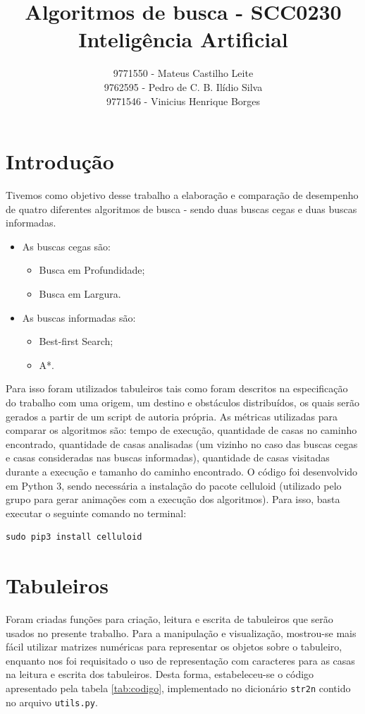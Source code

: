 \documentclass[12pt]{article}
\title{Algoritmos de busca - SCC0230 Inteligência Artificial}
\author{9771550 - Mateus Castilho Leite\\
9762595 - Pedro de C. B. Ilídio Silva\\
9771546 - Vinicius Henrique Borges}
\begin{document}
\maketitle
\section{Introdução}
Tivemos como objetivo desse trabalho a elaboração e comparação de desempenho de quatro diferentes algoritmos de busca - sendo duas buscas cegas e duas buscas informadas.

\begin{itemize}
	\item As buscas cegas são:
	\begin{itemize}
		\item Busca em Profundidade;
		\item Busca em Largura.
	\end{itemize}
	\item As buscas informadas são:
	\begin{itemize}
		\item Best-first Search;
		\item A*.
	\end{itemize}
\end{itemize}

	Para isso foram utilizados tabuleiros tais como foram descritos na especificação do trabalho com uma origem, um destino e obstáculos distribuídos, os quais serão gerados a partir de um script de autoria própria.
	As métricas utilizadas para comparar os algoritmos são: tempo de execução, quantidade de casas no caminho encontrado, quantidade de casas analisadas (um vizinho no caso das buscas cegas e casas consideradas nas buscas informadas), quantidade de casas visitadas durante a execução e tamanho do caminho encontrado.
	O código foi desenvolvido em Python 3, sendo necessária a instalação do pacote celluloid (utilizado pelo grupo para gerar animações com a execução dos algoritmos). Para isso, basta executar o seguinte comando no terminal:

\begin{verbatim}
sudo pip3 install celluloid
\end{verbatim}

\section{Tabuleiros}
Foram criadas funções para criação, leitura e escrita de tabuleiros que serão usados no presente trabalho. Para a manipulação e visualização, mostrou-se mais fácil utilizar matrizes numéricas para representar os objetos sobre o tabuleiro, enquanto nos foi requisitado o uso de representação com caracteres para as casas na leitura e escrita dos tabuleiros. Desta forma, estabeleceu-se o código apresentado pela tabela \ref{tab:codigo}, implementado no dicionário \verb|str2n| contido no arquivo \verb|utils.py|.
\end{document}
